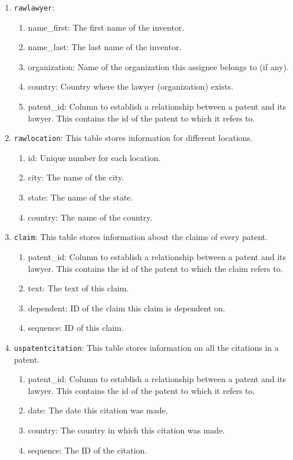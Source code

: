 \begin{enumerate}
\item \verb`rawlawyer`: 
\begin{enumerate}
\item name\_first: The first name of the inventor.
\item name\_last: The last name of the inventor.
\item organization: Name of the organization this assignee belongs to (if any).
\item country: Country where the lawyer (organization) exists.
\item patent\_id: Column to establish a relationship between a patent and its lawyer. This contains the id of the patent to which it refers to.
\end{enumerate}

\item \verb`rawlocation`: This table stores information for different locations.
\begin{enumerate}
\item id: Unique number for each location.
\item city: The name of the city.
\item state: The name of the state.
\item country: The name of the country.
\end{enumerate}

\item \verb`claim`: This table stores information about the claims of every patent.
\begin{enumerate}
\item patent\_id: Column to establish a relationship between a patent and its lawyer. This contains the id of the patent to which the claim refers to.
\item text: The text of this claim.
\item dependent: ID of the claim this claim is dependent on.
\item sequence: ID of this claim.
\end{enumerate}

\item \verb`uspatentcitation`: This table stores information on all the citations in a patent.
\begin{enumerate}
\item patent\_id: Column to establish a relationship between a patent and its lawyer. This contains the id of the patent to which it refers to.
\item date: The date this citation was made.
\item country: The country in which this citation was made.
\item sequence: The ID of the citation.
\end{enumerate}


\end{enumerate}